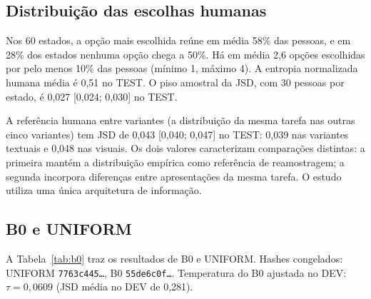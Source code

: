 \documentclass[12pt]{article}
\newcommand{\code}[1]{\texttt{#1}}
\begin{document}
\subsection{Distribuição das escolhas humanas}

\begin{real}
Nos 60 estados, a opção mais escolhida reúne em média 58\% das pessoas, e em 28\% dos estados nenhuma opção chega a 50\%. Há em média 2,6 opções escolhidas por pelo menos 10\% das pessoas (mínimo 1, máximo 4). A entropia normalizada humana média é 0,51 no TEST. O piso amostral da JSD, com 30 pessoas por estado, é 0,027 [0,024; 0,030] no TEST.

A referência humana entre variantes (a distribuição da mesma tarefa nas outras cinco variantes) tem JSD de 0,043 [0,040; 0,047] no TEST: 0,039 nas variantes textuais e 0,048 nas visuais. Os dois valores caracterizam comparações distintas: a primeira mantém a distribuição empírica como referência de reamostragem; a segunda incorpora diferenças entre apresentações da mesma tarefa. O estudo utiliza uma única arquitetura de informação.
\end{real}

\subsection{B0 e UNIFORM}

\begin{real}
A Tabela~\ref{tab:b0} traz os resultados de B0 e UNIFORM. Hashes congelados: UNIFORM \code{7763c445\ldots}, B0 \code{55de6c0f\ldots}. Temperatura do B0 ajustada no DEV: $\tau=0{,}0609$ (JSD média no DEV de 0,281).
\end{real}
\end{document}
